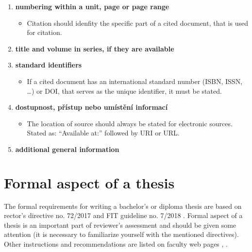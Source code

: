 \begin{enumerate}
    \begin{itemize}
        \item If the place of publication is not stated in the cited document, but is known, we state it in square brackets.
        \item A publisher should be a person or organisation that is the most emphasized in the cited document.
        \item Date of publication should always be stated. A year is sufficient for paper publications, however it is necessary to also state a month and a day for electronic sources.
    \end{itemize}
    \item \textbf{numbering within a unit, page or page range}
    \begin{itemize}
        \item Citation should idenfity the specific part of a cited document, that is used for citation.
    \end{itemize}
    \item \textbf{title and volume in series, if they are available}
    \item \textbf{standard identifiers}
    \begin{itemize}
        \item If a cited document has an international standard number (ISBN, ISSN, \ldots) or DOI, that serves as the unique identifier, it must be stated.
    \end{itemize}
    \item \textbf{dostupnost, přístup nebo umístění informací}
    \begin{itemize}
        \item The location of source should always be stated for electronic sources. Stated as: ``Available at:'' followed by URI or URL.
    \end{itemize}
    \item \textbf{additional general information}
\end{enumerate}

\chapter{Formal aspect of a thesis}
\label{formality}

The formal requirements for writing a bachelor's or diploma thesis are based on rector's directive no. 72/2017 \cite{smernice} and FIT guideline no. 7/2018 \cite{smerniceFIT}. Formal aspect of a thesis is an important part of reviewer's assessment and should be given some attention (it is necessary to familiarize yourself with the mentioned directives). Other instructions and recommendations are listed on faculty web pages \cite{formalniBP}, \cite{formalniDP}.

